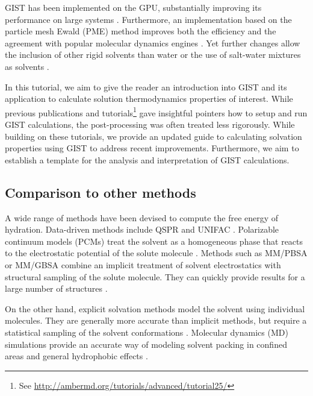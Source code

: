 \documentclass[9pt,tutorial]{livecoms}
\begin{document}
GIST has been implemented on the GPU, substantially improving its performance on large systems \cite{Kraml2019-gigist}.
Furthermore, an implementation based on the particle mesh Ewald (PME) \cite{Darden1993-pme} method improves both the efficiency and the agreement with popular molecular dynamics engines \cite{Chen2021}. 
Yet further changes allow the inclusion of other rigid solvents than water \cite{Kraml2020,Waibl2022-gist-solvents} or the use of salt-water mixtures as solvents \cite{Waibl2021-gist-salt}.

In this tutorial, we aim to give the reader an introduction into GIST and its application to calculate solution thermodynamics properties of interest. 
While previous publications \cite{Ramsey2016} and tutorials\footnote{See \url{http://ambermd.org/tutorials/advanced/tutorial25/}} gave insightful pointers how to setup and run GIST calculations, the post-processing was often treated less rigorously. While building on these tutorials, we provide an updated guide to calculating solvation properties using GIST to address recent improvements.
Furthermore, we aim to establish a template for the analysis and interpretation of GIST calculations.

\subsection{Comparison to other methods}
A wide range of methods have been devised to compute the free energy of hydration.
Data-driven methods include QSPR and UNIFAC \cite{Borhani2019-qspr,Fredenslund1975-unifac}.
Polarizable continuum models (PCMs) \cite{Miertus1981-pcm,Klamt1993-cosmo} treat the solvent as a homogeneous phase that reacts to the electrostatic potential of the solute molecule \cite{Mennucci2010-pcm}.
Methods such as MM/PBSA or MM/GBSA \cite{Sitkoff1994-pbsa,Kollman2000-mmpbsa} combine an implicit treatment of solvent electrostatics with structural sampling of the solute molecule.
They can quickly provide results for a large number of structures \cite{Genheden2015-mmpbsa-review}.

On the other hand, explicit solvation methods model the solvent using individual molecules.
They are generally more accurate than implicit methods, but require a statistical sampling of the solvent conformations \cite{Liu2016-md-solubility,Swails2014-cphmd}.
Molecular dynamics (MD) simulations provide an accurate way of modeling solvent packing in confined areas \cite{Haider2016-water-on-surfaces} and general hydrophobic effects \cite{Pratt2016-hydrophobicity}.
\end{document}
